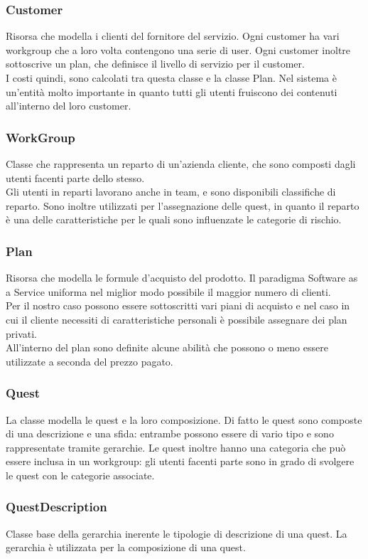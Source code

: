 \subsubsection{Customer} Risorsa che modella i clienti del fornitore del servizio. Ogni customer ha vari workgroup che a loro volta contengono una serie di user. Ogni customer inoltre sottoscrive un plan, che definisce il livello di servizio per il customer.\\
I costi quindi, sono calcolati tra questa classe e la classe Plan. Nel sistema è un'entità molto importante in quanto tutti gli utenti fruiscono dei contenuti all’interno del loro customer.\\
\subsubsection{WorkGroup} Classe che rappresenta un reparto di un’azienda cliente, che sono composti dagli utenti facenti parte dello stesso.\\
Gli utenti in reparti lavorano anche in team, e sono disponibili classifiche di reparto. Sono inoltre utilizzati per l’assegnazione delle quest, in quanto il reparto è una delle caratteristiche per le quali sono influenzate le categorie di rischio.
\subsubsection{Plan}Risorsa che modella le formule d’acquisto del prodotto. Il paradigma Software as a Service uniforma nel miglior modo possibile il maggior numero di clienti.\\
Per il nostro caso possono essere sottoscritti vari piani di acquisto e nel caso in cui il cliente necessiti di caratteristiche personali è possibile assegnare dei plan privati.\\
All’interno del plan sono definite alcune abilità che possono o meno essere utilizzate a seconda del prezzo pagato.
\subsubsection{Quest} La classe modella le quest e la loro composizione. Di fatto le quest sono composte di una descrizione e una sfida: entrambe possono essere di vario tipo e sono rappresentate tramite gerarchie.
Le quest inoltre hanno una categoria che può essere inclusa in un workgroup: gli utenti facenti parte sono in grado di svolgere le quest con le categorie associate.
\subsubsection{QuestDescription}Classe base della gerarchia inerente le tipologie di descrizione di una quest. La gerarchia è utilizzata per la composizione di una quest.
